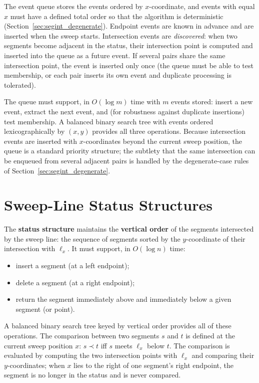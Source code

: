 The event queue stores the events ordered by $x$-coordinate, and events with
equal $x$ must have a defined total order so that the algorithm is
deterministic (Section~\ref{sec:segint_degenerate}). Endpoint events are
known in advance and are inserted when the sweep starts. Intersection
events are \emph{discovered}: when two segments become adjacent in the
status, their intersection point is computed and inserted into the queue as
a future event. If several pairs share the same intersection point, the
event is inserted only once (the queue must be able to test membership, or
each pair inserts its own event and duplicate processing is tolerated).

The queue must support, in $O(\log m)$ time with $m$ events stored:
insert a new event, extract the next event, and (for robustness against
duplicate insertions) test membership. A balanced binary search tree with
events ordered lexicographically by $(x, y)$ provides all three operations.
Because intersection events are inserted with $x$-coordinates beyond the
current sweep position, the queue is a standard priority structure; the
subtlety that the same intersection can be enqueued from several adjacent
pairs is handled by the degenerate-case rules of
Section~\ref{sec:segint_degenerate}.


\section{Sweep-Line Status Structures}
\label{sec:segint_status}

The \textbf{status structure} maintains the
\textbf{vertical order} of the segments intersected by the sweep line: the
sequence of segments sorted by the $y$-coordinate of their intersection with
$\ell_x$. It must support, in $O(\log n)$ time:
\begin{itemize}
  \item insert a segment (at a left endpoint);
  \item delete a segment (at a right endpoint);
  \item return the segment immediately above and immediately below a given
    segment (or point).
\end{itemize}
A balanced binary search tree keyed by vertical order provides all of these
operations. The comparison between two segments $s$ and $t$ is defined at
the current sweep position $x$: $s \prec t$ iff $s$ meets $\ell_x$ below
$t$. The comparison is evaluated by computing the two intersection points
with $\ell_x$ and comparing their $y$-coordinates; when $x$ lies to the
right of one segment's right endpoint, the segment is no longer in the
status and is never compared.

